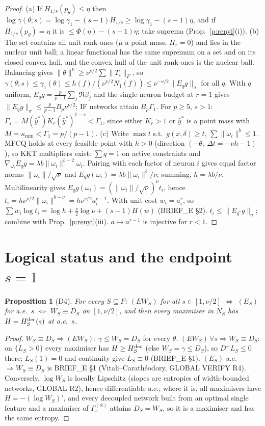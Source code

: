 \documentclass[11pt]{article}
\newtheorem{proposition}{Proposition}[section]\newtheorem{lemma}[proposition]{Lemma}\newtheorem{corollary}[proposition]{Corollary}
\theoremstyle{remark}\newtheorem{remark}[proposition]{Remark}
\begin{document}
\begin{proof}
(a) If $H_{1/s}(p_\theta)\le\eta$ then $\log\gamma(\theta;s)=\log\gamma_1-(s-1)H_{1/s}\ge\log\gamma_1-(s-1)\eta$, and if $H_{1/s}(p_\theta)=\eta$ it is
$\le\Phi(\eta)-(s-1)\eta$; take suprema (Prop.~\ref{p:renyi}(i)).
(b) The set contains all unit rank-ones ($\mu$ a point mass, $H_r=0$) and lies in the nuclear unit ball; a linear functional has the same supremum
on a set and on its closed convex hull, and the convex hull of the unit rank-ones is the nuclear ball. Balancing gives $\|\theta\|^\nu\ge\nu^{\nu/2}\sum\|T_i\|_F$,
so $\gamma(\theta;s)\le\gamma_1(\theta)\le h(f)/(\nu^{\nu/2}N_1(f))\le\nu^{-\nu/2}\|E_qg\|_\sigma$ for all $q$. With $q$ uniform, $E_qg=\frac p{p-1}\sum_j\Re\beta_j$
and the single-neuron budget at $r=1$ gives $\|E_qg\|_\sigma\le\frac p{p-1}B_p\nu^{\nu/2}$; IF networks attain $B_p\Gamma_1$. For $p\ge5$, $s>1$:
$\Gamma_s=M(\hat y^*)K_r(\hat y^*)^{1-s}<\Gamma_1$, since either $K_r>1$ or $\hat y^*$ is a point mass with $M=\kappa_{\min}<\Gamma_1=p/(p-1)$.
(c) Write $\max t$ s.t.\ $g(x,\delta)\ge t$, $\sum\|\omega_i\|^b\le1$. MFCQ holds at every feasible point with $h>0$ (direction $(-\theta,\ \Delta t=-\nu h-1)$), so
KKT multipliers exist: $\sum q=1$ on active constraints and $\nabla_{\omega_i}E_{q}g=\lambda b\|\omega_i\|^{b-2}\omega_i$. Pairing with each factor of neuron $i$
gives equal factor norms $\|\omega_i\|/\sqrt\nu$ and $E_qg(\omega_i)=\lambda b\|\omega_i\|^b/\nu$; summing, $h=\lambda b/\nu$. Multilinearity gives
$E_qg(\omega_i)=(\|\omega_i\|/\sqrt\nu)^\nu t_i$, hence $t_i=h\nu^{\nu/2}\|\omega_i\|^{b-\nu}=h\nu^{\nu/2}a_i^{r-1}$. With unit cost $w_i=a_i^r$, so
$\sum w_i\log t_i=\log h+\tfrac\nu2\log\nu+(s-1)H(w)$ (BRIEF\_E \S2). $t_i\le\|E_{q^*}g\|_\sigma$; combine with Prop.~\ref{p:renyi}(iii). $a\mapsto a^{r-1}$ is injective for $r<1$.
\end{proof}

\section{Logical status and the endpoint $s=1$}
\begin{proposition}[D4]\label{p:logic}
For every $S\subseteq F$: $(EW_S)$ for all $s\in[1,\nu/2]$ $\iff$ $(E_S)$ for a.e.\ $s$ $\iff$ $W_S\equiv D_S$ on $[1,\nu/2]$, and then every maximiser in $N_S$
has $H=H^{\rm dec}_S(s)$ at a.e.\ $s$.
\end{proposition}
\begin{proof}
$W_S\equiv D_S\Rightarrow(EW_S)$: $\gamma\le W_S=D_S$ for every $\theta$. $(EW_S)\,\forall s\Rightarrow W_S\equiv D_S$: on $\{L_S>0\}$ every maximiser has
$H\ge H^{\rm dec}_S$ (else $W_S=\gamma\le D_S$), so $D^+L_S\le0$ there; $L_S(1)=0$ and continuity give $L_S\equiv0$ (BRIEF\_E \S1).
$(E_S)$ a.e.\ $\Rightarrow W_S\equiv D_S$ is BRIEF\_E \S1 (Vitali--Carathéodory, GLOBAL VERIFY R4). Conversely, $\log W_S$ is locally Lipschitz (slopes are entropies of
width-bounded networks, GLOBAL R2), hence differentiable a.e.; where it is, all maximisers have $H=-(\log W_S)'$, and every decoupled network built from an
optimal single feature and a maximiser of $\Gamma^{(S)}_s$ attains $D_S=W_S$, so it is a maximiser and has the same entropy.
\end{proof}
\end{document}
